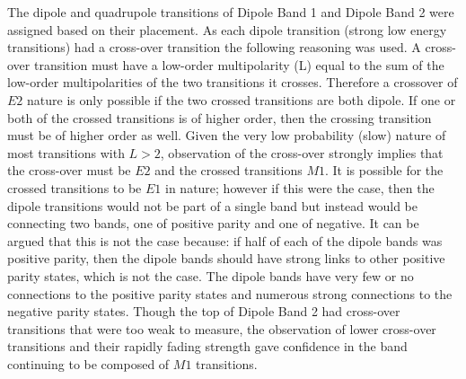 The dipole and quadrupole transitions of Dipole Band 1 and Dipole Band 2 were assigned based on their placement. As each dipole transition (strong low energy transitions) had a cross-over transition the following reasoning was used. A cross-over transition must have a low-order multipolarity (L) equal to the sum of the low-order multipolarities of the two transitions it crosses. Therefore a crossover of $E2$ nature is only possible if the two crossed transitions are both dipole. If one or both of the crossed transitions is of higher order, then the crossing transition must be of higher order as well. Given the very low probability (slow) nature of most transitions with $L>2$, observation of the cross-over strongly implies that the cross-over must be $E2$ and the crossed transitions $M1$. It is possible for the crossed transitions to be $E1$ in nature; however if this were the case, then the dipole transitions would not be part of a single band but instead would be connecting two bands, one of positive parity and one of negative. It can be argued that this is not the case because: if half of each of the dipole bands was positive parity, then the dipole bands should have strong links to other positive parity states, which is not the case. The dipole bands have very few or no connections to the positive parity states and numerous strong connections to the negative parity states. Though the top of Dipole Band 2 had cross-over transitions that were too weak to measure, the observation of lower cross-over transitions and their rapidly fading strength gave confidence in the band continuing to be composed of $M1$ transitions.

